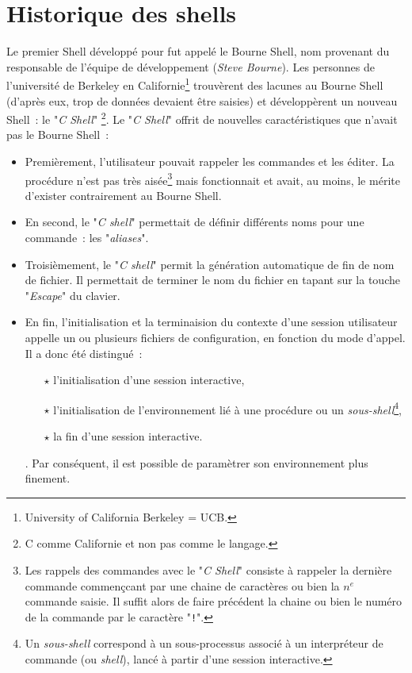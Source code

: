\section{Historique des shells}

Le premier Shell d{\'e}velopp{\'e} pour {\Unix} fut appel{\'e} le
Bourne Shell, nom provenant du responsable
de l'{\'e}quipe de d{\'e}veloppement ({\sl Steve Bourne}). Les personnes
de l'universit{\'e} de Berkeley en Californie\footnote{University of
California Berkeley = UCB.} trouv{\`e}rent des lacunes au Bourne Shell
(d'apr{\`e}s eux, trop de donn{\'e}es devaient {\^e}tre saisies) et
d{\'e}velopp{\`e}rent un nouveau Shell~: le
"{\sl C Shell}" \footnote{C comme
Californie et non pas comme le langage.}. Le "{\sl C Shell}" offrit
de nouvelles caract{\'e}ristiques que n'avait pas le Bourne Shell~:
\begin{itemize}
	\item	Premi{\`e}rement, l'utilisateur pouvait rappeler les commandes et les {\'e}diter. La proc{\'e}dure
			n'est pas tr{\`e}s ais{\'e}e\footnote{Les rappels des commandes avec le "{\sl C Shell}" consiste
			{\`a} rappeler la derni{\`e}re commande commen\c{c}cant par une chaine de caract{\`e}res ou bien la $n^{e}$
			commande saisie. Il suffit alors de faire pr{\'e}c{\'e}dent la chaine ou bien le num{\'e}ro de la
			commande par le caract{\`e}re "{\tt !}".} mais fonctionnait et avait, au moins, le m{\'e}rite d'exister
			contrairement au Bourne Shell.
	\item	En second, le "{\sl C shell}" permettait de d{\'e}finir diff{\'e}rents noms pour une
			commande~: les "{\sl aliases}".
	\item	Troisi{\`e}mement, le "{\sl C shell}" permit la g{\'e}n{\'e}ration automatique
			de fin de nom de fichier. Il permettait de terminer le nom du fichier en tapant
			sur la touche "{\sl Escape}" du clavier.
	\item	En fin, l'initialisation et la terminaision du contexte d'une session utilisateur
			appelle un ou plusieurs fichiers de configuration, en fonction du mode d'appel.
			Il a donc {\'e}t{\'e} distingu{\'e}~:
			\begin{itemize}
				\item[$\star$] l'initialisation d'une session interactive,
				\item[$\star$] l'initialisation de l'environnement li{\'e} {\`a} une proc{\'e}dure ou
								un {\it sous-shell}\footnote{Un {\it sous-shell} correspond
								{\`a} un sous-processus associ{\'e} {\`a} un interpr{\'e}teur de commande
								(ou {\it shell}), lanc{\'e} {\`a} partir d'une session interactive.},
				\item[$\star$] la fin d'une session interactive.
			\end{itemize}.
			Par cons{\'e}quent, il est possible de param{\`e}trer son environnement plus finement.
\end{itemize}


